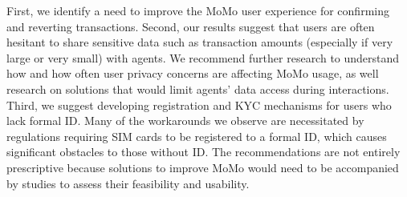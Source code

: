 First, we identify a need to improve the MoMo user experience for confirming and reverting transactions. 
Second, our results suggest that users are often hesitant to share sensitive data such as transaction amounts (especially if very large or very small) with agents. We recommend further research to understand how and how often user privacy concerns are affecting MoMo usage, as well research on solutions that would limit agents' data access during interactions. 
Third, we suggest developing registration and KYC mechanisms for users who lack formal ID. Many of the workarounds we observe are necessitated by regulations requiring SIM cards to be registered to a formal ID, which causes significant obstacles to those without ID. The recommendations are not entirely prescriptive because solutions to improve MoMo would need to be accompanied by studies to assess their feasibility and usability.
